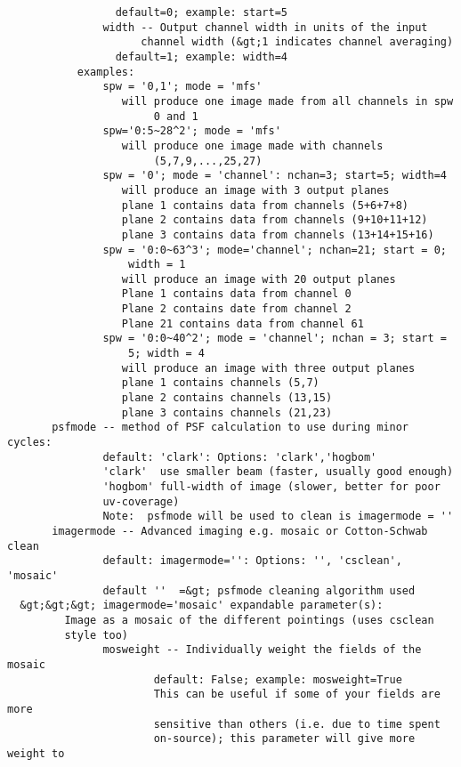 \begin{verbatim}
                 default=0; example: start=5
               width -- Output channel width in units of the input
                     channel width (&gt;1 indicates channel averaging)
                 default=1; example: width=4
           examples:
               spw = '0,1'; mode = 'mfs'
                  will produce one image made from all channels in spw 
                       0 and 1
               spw='0:5~28^2'; mode = 'mfs'
                  will produce one image made with channels 
                       (5,7,9,...,25,27)
               spw = '0'; mode = 'channel': nchan=3; start=5; width=4
                  will produce an image with 3 output planes
                  plane 1 contains data from channels (5+6+7+8)
                  plane 2 contains data from channels (9+10+11+12)
                  plane 3 contains data from channels (13+14+15+16)
               spw = '0:0~63^3'; mode='channel'; nchan=21; start = 0; 
                   width = 1
                  will produce an image with 20 output planes
                  Plane 1 contains data from channel 0
                  Plane 2 contains date from channel 2
                  Plane 21 contains data from channel 61
               spw = '0:0~40^2'; mode = 'channel'; nchan = 3; start = 
                   5; width = 4
                  will produce an image with three output planes
                  plane 1 contains channels (5,7)
                  plane 2 contains channels (13,15)
                  plane 3 contains channels (21,23)
       psfmode -- method of PSF calculation to use during minor cycles:
               default: 'clark': Options: 'clark','hogbom'
               'clark'  use smaller beam (faster, usually good enough)
               'hogbom' full-width of image (slower, better for poor 
               uv-coverage)
               Note:  psfmode will be used to clean is imagermode = ''
       imagermode -- Advanced imaging e.g. mosaic or Cotton-Schwab clean
               default: imagermode='': Options: '', 'csclean', 'mosaic'
               default ''  =&gt; psfmode cleaning algorithm used
  &gt;&gt;&gt; imagermode='mosaic' expandable parameter(s):
         Image as a mosaic of the different pointings (uses csclean 
         style too)
               mosweight -- Individually weight the fields of the mosaic
                       default: False; example: mosweight=True
                       This can be useful if some of your fields are more
                       sensitive than others (i.e. due to time spent 
                       on-source); this parameter will give more weight to 

\end{verbatim}
